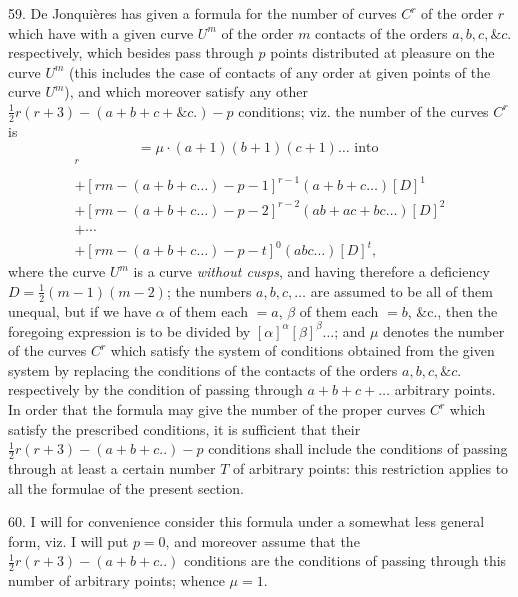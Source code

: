 \documentclass[12pt,a4paper]{article}
\begin{document}
59. De Jonqui\`eres has given a formula for the number of curves $C^r$ of the order $r$ which have with a given curve $U^m$ of the order $m$ contacts of the orders $a, b, c, \&c.$ respectively, which besides pass through $p$ points distributed at pleasure on the curve $U^m$ (this includes the case of contacts of any order at given points of the curve $U^m$), and which moreover satisfy any other $\tfrac{1}{2}r(r+3) - (a+b+c+\&c.) - p$ conditions; viz. the number of the curves $C^r$ is
\[
= \mu \cdot (a+1)(b+1)(c+1) \dots \text{ into }
\]
\begin{multline*}
[rm - (a+b+c\ldots) - p]^r \\
+ [rm - (a+b+c\ldots) - p - 1]^{r-1} (a+b+c\ldots) [D]^1 \\
+ [rm - (a+b+c\ldots) - p - 2]^{r-2} (ab+ac+bc\ldots) [D]^2 \\
+ \cdots \\
+ [rm - (a+b+c\ldots) - p - t]^0 (abc\ldots) [D]^t,
\end{multline*}
where the curve $U^m$ is a curve \textit{without cusps}, and having therefore a deficiency $D = \tfrac{1}{2}(m-1)(m-2)$; the numbers $a, b, c, \ldots$ are assumed to be all of them unequal, but if we have $\alpha$ of them each $=a$, $\beta$ of them each $=b$, \&c., then the foregoing expression is to be divided by $[\alpha]^\alpha [\beta]^\beta \ldots$; and $\mu$ denotes the number of the curves $C^r$ which satisfy the system of conditions obtained from the given system by replacing the conditions of the contacts of the orders $a, b, c, \&c.$ respectively by the condition of passing through $a+b+c+\ldots$ arbitrary points. In order that the formula may give the number of the proper curves $C^r$ which satisfy the prescribed conditions, it is sufficient that their $\tfrac{1}{2}r(r+3) - (a+b+c..) - p$ conditions shall include the conditions of passing through at least a certain number $T$ of arbitrary points: this restriction applies to all the formulae of the present section.

60. I will for convenience consider this formula under a somewhat less general form, viz. I will put $p = 0$, and moreover assume that the $\tfrac{1}{2}r(r+3) - (a+b+c..)$ conditions are the conditions of passing through this number of arbitrary points; whence $\mu = 1$.
\end{document}
